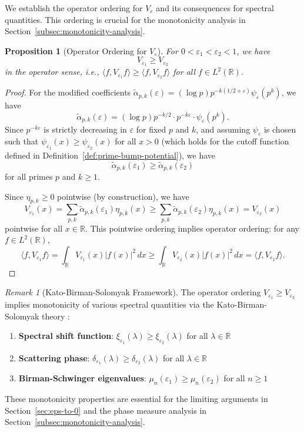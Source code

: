 ﻿\documentclass[12pt,a4paper]{article}
\newtheorem{proposition}[theorem]{Proposition}
\theoremstyle{definition}
\theoremstyle{remark}
\newtheorem{remark}[theorem]{Remark}
\newcommand{\RR}{\mathbb{R}}
\begin{document}
We establish the operator ordering for $V_\varepsilon$ and its consequences for spectral quantities. This ordering is crucial for the monotonicity analysis in Section~\ref{subsec:monotonicity-analysis}.

\begin{proposition}[Operator Ordering for $V_\varepsilon$]
\label{prop:operator-ordering}
For $0 < \varepsilon_1 < \varepsilon_2 < 1$, we have
\[
V_{\varepsilon_1} \geq V_{\varepsilon_2}
\]
in the operator sense, i.e., $\langle f, V_{\varepsilon_1} f \rangle \geq \langle f, V_{\varepsilon_2} f \rangle$ for all $f \in L^2(\RR)$.
\end{proposition}

\begin{proof}
For the modified coefficients $\widetilde{\alpha}_{p,k}(\varepsilon) = (\log p) p^{-k(1/2+\varepsilon)} \psi_\varepsilon(p^k)$, we have
\[
\widetilde{\alpha}_{p,k}(\varepsilon) = (\log p) p^{-k/2} \cdot p^{-k\varepsilon} \cdot \psi_\varepsilon(p^k).
\]
Since $p^{-k\varepsilon}$ is strictly decreasing in $\varepsilon$ for fixed $p$ and $k$, and assuming $\psi_\varepsilon$ is chosen such that $\psi_{\varepsilon_1}(x) \geq \psi_{\varepsilon_2}(x)$ for all $x > 0$ (which holds for the cutoff function defined in Definition~\ref{def:prime-bump-potential}), we have
\[
\widetilde{\alpha}_{p,k}(\varepsilon_1) \geq \widetilde{\alpha}_{p,k}(\varepsilon_2)
\]
for all primes $p$ and $k \geq 1$.

Since $\eta_{p,k} \geq 0$ pointwise (by construction), we have
\[
V_{\varepsilon_1}(x) = \sum_{p,k} \widetilde{\alpha}_{p,k}(\varepsilon_1) \eta_{p,k}(x) \geq \sum_{p,k} \widetilde{\alpha}_{p,k}(\varepsilon_2) \eta_{p,k}(x) = V_{\varepsilon_2}(x)
\]
pointwise for all $x \in \RR$. This pointwise ordering implies operator ordering: for any $f \in L^2(\RR)$,
\[
\langle f, V_{\varepsilon_1} f \rangle = \int_\RR V_{\varepsilon_1}(x) |f(x)|^2 \, dx \geq \int_\RR V_{\varepsilon_2}(x) |f(x)|^2 \, dx = \langle f, V_{\varepsilon_2} f \rangle.
\]
\end{proof}

\begin{remark}[Kato-Birman-Solomyak Framework]
\label{rem:kato-birman-solomyak}
The operator ordering $V_{\varepsilon_1} \geq V_{\varepsilon_2}$ implies monotonicity of various spectral quantities via the Kato-Birman-Solomyak theory \cite{Birman1975, Kato1976}:
\begin{enumerate}
\item \textbf{Spectral shift function}: $\xi_{\varepsilon_1}(\lambda) \geq \xi_{\varepsilon_2}(\lambda)$ for all $\lambda \in \RR$
\item \textbf{Scattering phase}: $\delta_{\varepsilon_1}(\lambda) \geq \delta_{\varepsilon_2}(\lambda)$ for all $\lambda \in \RR$
\item \textbf{Birman-Schwinger eigenvalues}: $\mu_n(\varepsilon_1) \geq \mu_n(\varepsilon_2)$ for all $n \geq 1$
\end{enumerate}
These monotonicity properties are essential for the limiting arguments in Section~\ref{sec:eps-to-0} and the phase measure analysis in Section~\ref{subsec:monotonicity-analysis}.
\end{remark}
\end{document}
